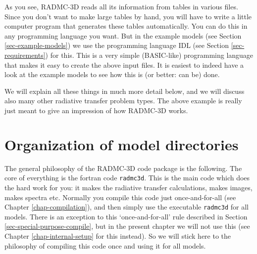 \documentclass{report}
\begin{document}
As you see, RADMC-3D reads all its information from tables in various
files. Since you don't want to make large tables by hand, you will have
to write a little computer program that generates these tables automatically.
You can do this in any programming language you want. But in the example
models (see Section \ref{sec-example-models}) we use the programming 
language IDL (see Section \ref{sec-requirements}) for this. This is a
very simple (BASIC-like) programming language that makes it easy to
create the above input files. It is easiest to indeed have a look at
the example models to see how this is (or better: can be) done. 

We will explain all these things in much more detail below, and we will
discuss also many other radiative transfer problem types. The above example
is really just meant to give an impression of how RADMC-3D works. 



\section{Organization of model directories}
\label{sec-rough-overview-models}
%
The general philosophy of the RADMC-3D code package is the following. The
core of everything is the fortran code {\small\tt radmc3d}. This is the main
code which does the hard work for you: it makes the radiative transfer
calculations, makes images, makes spectra etc. Normally you compile this
code just once-and-for-all (see Chapter \ref{chap-compilation}), and then
simply use the executable {\small\tt radmc3d} for all models. There is an
exception to this `once-and-for-all' rule described in Section
\ref{sec-special-purpose-compile}, but in the present chapter we will not
use this (see Chapter \ref{chap-internal-setup} for this instead). So we
will stick here to the philosophy of compiling this code once and using it
for all models.
\end{document}
